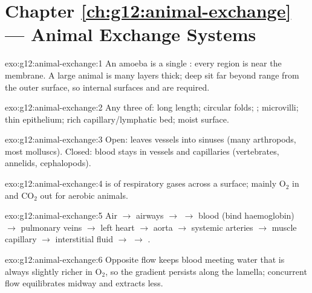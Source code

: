 \section*{Chapter \ref{ch:g12:animal-exchange} --- Animal Exchange Systems}

\begin{solution}{exo:g12:animal-exchange:1}
An amoeba is a single : every region is near the membrane. A large
animal is many  layers thick; deep  sit far beyond 
range from the outer surface, so internal surfaces and  are
required.
\end{solution}

\begin{solution}{exo:g12:animal-exchange:2}
Any three of: long length; circular folds; ; microvilli; thin
epithelium; rich capillary/lymphatic bed; moist surface.
\end{solution}

\begin{solution}{exo:g12:animal-exchange:3}
Open:  leaves vessels into sinuses (many arthropods, most
molluscs). Closed: blood stays in vessels and capillaries (vertebrates,
annelids, cephalopods).
\end{solution}

\begin{solution}{exo:g12:animal-exchange:4}
 is  of respiratory gases across a surface; mainly
O$_2$ in and CO$_2$ out for aerobic animals.
\end{solution}

\begin{solution}{exo:g12:animal-exchange:5}
Air $\to$ airways $\to$  $\to$ blood (bind haemoglobin) $\to$
pulmonary veins $\to$ left heart $\to$ aorta $\to$ systemic arteries
$\to$ muscle capillary $\to$ interstitial fluid $\to$  $\to$
.
\end{solution}

\begin{solution}{exo:g12:animal-exchange:6}
Opposite flow keeps blood meeting water that is always slightly richer
in O$_2$, so the gradient persists along the lamella; concurrent flow
equilibrates midway and extracts less.
\end{solution}

